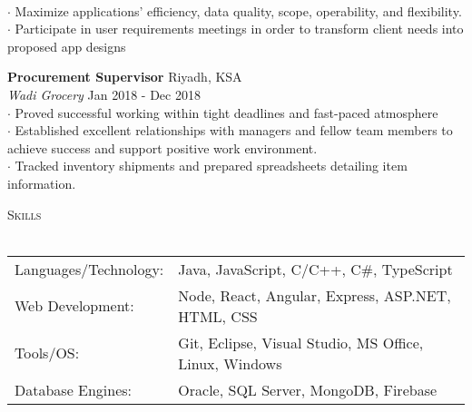 \documentclass[a4paper]{article}
\newcommand{\lineunder} {
    \vspace*{-8pt} \\
    \hspace*{-18pt} \hrulefill \\
}
\newcommand{\header} [1] {
    {\hspace*{-18pt}\vspace*{6pt} \textsc{#1}}
    \vspace*{-6pt} \lineunder
}
\begin{document}
\\
$\cdot$ Maximize applications’ efficiency, data quality, scope, operability, and flexibility.\\
$\cdot$ Participate in user requirements meetings in order to transform client needs into proposed app designs \\
\vspace*{2mm}

\textbf{Procurement Supervisor} \hfill Riyadh, KSA\\
\textit{Wadi Grocery} \hfill Jan 2018 - Dec 2018\\\vspace*{0.5mm}
$\cdot$ Proved successful working within tight deadlines and fast-paced atmosphere\\
$\cdot$ Established excellent relationships with managers and fellow team members to achieve success and support positive work environment.\\
$\cdot$ Tracked inventory shipments and prepared spreadsheets detailing item information.
\vspace*{2mm}


{\large\header{Skills}}\vspace{1mm}
\begin{tabular}{ l l  }
	Languages/Technology: & Java, JavaScript, C/C++, C\#, TypeScript  \\
	Web Development:   & Node, React, Angular, Express, ASP.NET, HTML, CSS \\
	Tools/OS:               & Git, Eclipse, Visual Studio, MS Office, Linux, Windows  \\
	Database Engines:      & Oracle, SQL Server, MongoDB, Firebase                            \\

\end{tabular}
\vspace{2mm}
\end{document}
